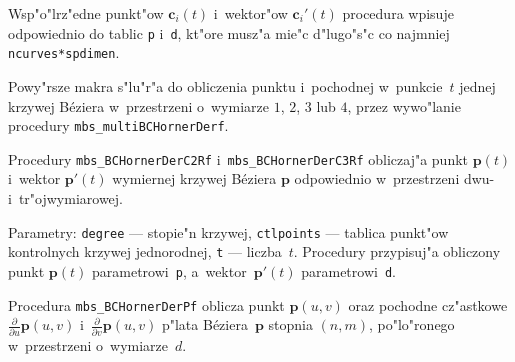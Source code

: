 Wsp"o"lrz"edne punkt"ow $\bm{c}_i(t)$ i~wektor"ow $\bm{c}_i'(t)$ procedura
wpisuje odpowiednio do tablic \texttt{p} i~\texttt{d}, kt"ore musz"a mie"c
d"lugo"s"c co najmniej \texttt{ncurves*spdimen}.

\vspace{\bigskipamount}
Powy"rsze makra s"lu"r"a do obliczenia punktu i~pochodnej w~punkcie~$t$
jednej krzywej B\'{e}ziera w~przestrzeni o~wymiarze $1$, $2$, $3$ lub $4$,
przez wywo"lanie procedury \texttt{mbs\_multiBCHornerDerf}.

\vspace{\bigskipamount}
Procedury \texttt{mbs\_BCHornerDerC2Rf} i~\texttt{mbs\_BCHornerDerC3Rf}
obliczaj"a punkt $\bm{p}(t)$ i~wektor $\bm{p}'(t)$ wymiernej krzywej
B\'{e}ziera $\bm{p}$ odpowiednio w~przestrzeni dwu- i~tr"ojwymiarowej.

Parametry: \texttt{degree} --- stopie"n krzywej, \texttt{ctlpoints} ---
tablica punkt"ow kon\-trol\-nych krzywej jednorodnej, \texttt{t} ---
liczba~$t$.
Procedury przypisuj"a obliczony punkt $\bm{p}(t)$ parametrowi~\texttt{p},
a~wektor~$\bm{p}'(t)$ parametrowi~\texttt{d}.

\vspace{\bigskipamount}
Procedura \texttt{mbs\_BCHornerDerPf} oblicza punkt $\bm{p}(u,v)$ oraz
pochodne cz"astkowe $\frac{\partial}{\partial u}\bm{p}(u,v)$
i~$\frac{\partial}{\partial v}\bm{p}(u,v)$ p"lata B\'{e}ziera~$\bm{p}$
stopnia $(n,m)$, po"lo"ronego w~przestrzeni o~wymiarze~$d$.

